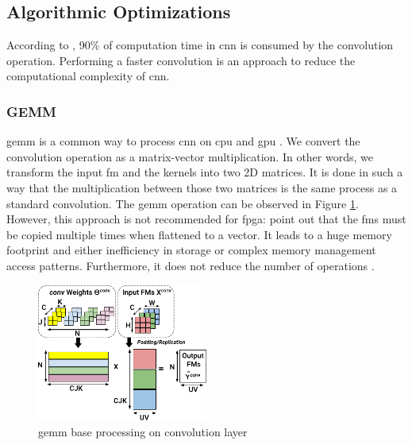 \subsection{Algorithmic Optimizations} \label{subsec:algopti}
According to \textcite{shawahna_fpga-based_2019}, 90\% of computation time in \acrshort{cnn} is consumed by the convolution operation. Performing a faster convolution is an approach to reduce the computational complexity of \acrshort{cnn}.
%
%
\subsubsection{GEMM}
%
%
\acrfull{gemm} is a common way to process \acrshort{cnn} on \acrshort{cpu} and \acrshort{gpu} \cite{abdelouahab_accelerating_2018}. We convert the convolution operation as a matrix-vector multiplication. In other words, we transform the input \acrshort{fm} and the kernels into two 2D matrices. It is done in such a way that the multiplication between those two matrices is the same process as a standard convolution. The \acrshort{gemm} operation can be observed in Figure \ref{fig:gemm}. However, this approach is not recommended for \acrshort{fpga}: \textcite{sze_efficient_2017, zhu_efficient_2020} point out that the \acrshort{fm}s must be copied multiple times when flattened to a vector. It leads to a huge memory footprint and either inefficiency in storage or complex memory management access patterns. Furthermore, it does not reduce the number of operations \cite{liang_evaluating_2020}.
%
\begin{figure}
    \centering
    \includegraphics[width=0.5\textwidth]{Images/gemm.pdf}
    \caption{\acrshort{gemm} base processing on convolution layer \cite{abdelouahab_accelerating_2018}}
    \label{fig:gemm}
\end{figure}
%
%
